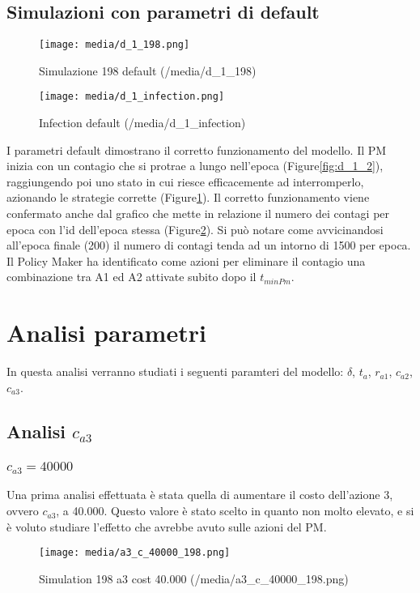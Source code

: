 \documentclass{article}
\begin{document}
{\subsection{Simulazioni con parametri di default}
\begin{figure}[H]
    \texttt{[image: media/d\_1\_198.png]}
    \caption{Simulazione 198 default (/media/d\_1\_198)}
    \label{fig:d_1_198}
\end{figure}
\begin{figure}[H]
    \texttt{[image: media/d\_1\_infection.png]}
    \caption{Infection default (/media/d\_1\_infection)}
    \label{fig:d_1_infection}
\end{figure}
I parametri default dimostrano il corretto funzionamento del modello. Il PM inizia con un contagio che si protrae a lungo nell'epoca (Figure\ref{fig:d_1_2}), raggiungendo poi uno stato in cui riesce efficacemente ad interromperlo, azionando le strategie corrette (Figure\ref{fig:d_1_198}).\newline
Il corretto funzionamento viene confermato anche dal grafico che mette in relazione il numero dei contagi per epoca con l'id dell'epoca stessa (Figure\ref{fig:d_1_infection}). Si può notare come avvicinandosi all'epoca finale (200) il numero di contagi tenda ad un intorno di 1500 per epoca.\newline
Il Policy Maker ha identificato come azioni per eliminare il contagio una combinazione tra A1 ed A2 attivate subito dopo il $t_{minPm}$.



\section{Analisi parametri}

In questa analisi verranno studiati i seguenti paramteri del modello: $\delta$, $t_{a}$, $r_{a1}$, $c_{a2}$, $c_{a3}$.

\subsection{Analisi $c_{a3}$}
\subsubsection{$c_{a3} = 40000$}
Una prima analisi effettuata è stata quella di aumentare il costo dell'azione 3, ovvero $c_{a3}$, a 40.000. Questo valore è stato scelto in quanto non molto elevato, e si è voluto studiare l'effetto che avrebbe avuto sulle azioni del PM. \newline
\begin{figure}[H]
    \texttt{[image: media/a3\_c\_40000\_198.png]}
    \caption{Simulation 198 a3 cost 40.000 (/media/a3\_c\_40000\_198.png)}
    \label{fig:a3_c_40000_198}
\end{figure}

}
\end{document}
